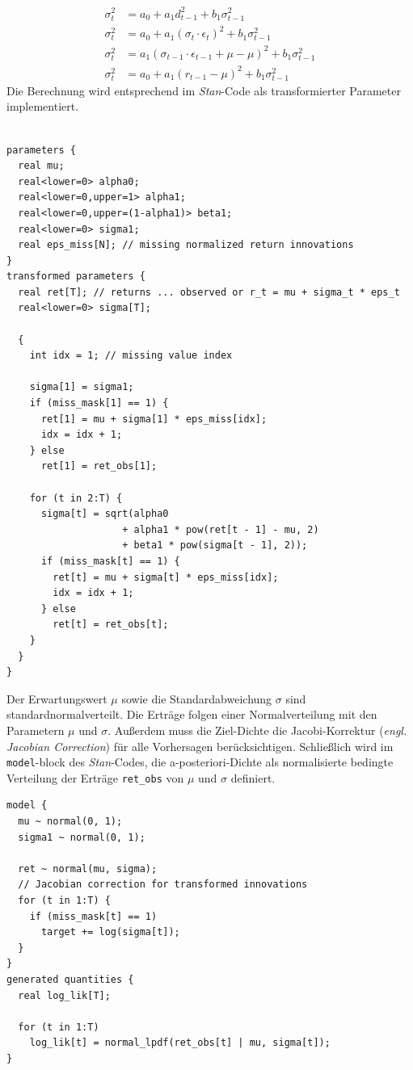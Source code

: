 \documentclass[ngerman]{ttlab-qualify}
\begin{document}
\begin{align}
\sigma_t^2 &= a_0 + a_1d_{t-1}^2 + b_1\sigma_{t-1}^2 \nonumber \\
\sigma_t^2 &=a_0+a_1(\sigma_t\cdot \epsilon_t)^2 + b_1\sigma_{t-1}^2\nonumber \\
\sigma_t^2 &=a_1(\sigma_{t-1}\cdot \epsilon_{t-1} +\mu -\mu)^2 +b_1\sigma_{t-1}^2 \nonumber \\
\sigma_t^2 &= a_0+a_1(r_{t-1}-\mu)^2 +b_1\sigma_{t-1}^2
\end{align} 
Die Berechnung wird entsprechend im \textit{Stan}-Code als  transformierter Parameter implementiert.
\begin{lstlisting}[style=custom]

parameters {
  real mu;
  real<lower=0> alpha0;
  real<lower=0,upper=1> alpha1;
  real<lower=0,upper=(1-alpha1)> beta1;
  real<lower=0> sigma1;
  real eps_miss[N]; // missing normalized return innovations
}
transformed parameters {
  real ret[T]; // returns ... observed or r_t = mu + sigma_t * eps_t
  real<lower=0> sigma[T];

  {
    int idx = 1; // missing value index

    sigma[1] = sigma1;
    if (miss_mask[1] == 1) {
      ret[1] = mu + sigma[1] * eps_miss[idx];
      idx = idx + 1;
    } else
      ret[1] = ret_obs[1];

    for (t in 2:T) {
      sigma[t] = sqrt(alpha0
                    + alpha1 * pow(ret[t - 1] - mu, 2)
                    + beta1 * pow(sigma[t - 1], 2));
      if (miss_mask[t] == 1) {
        ret[t] = mu + sigma[t] * eps_miss[idx];
        idx = idx + 1;
      } else
        ret[t] = ret_obs[t];
    }
  }
}

\end{lstlisting}
Der Erwartungswert $\mu$ sowie die Standardabweichung $\sigma$ sind standardnormalverteilt. Die Erträge folgen einer Normalverteilung mit den Parametern $\mu$ und $\sigma$. Außerdem muss die Ziel-Dichte die Jacobi-Korrektur (\textit{engl. Jacobian Correction}) für alle Vorhersagen berücksichtigen.
Schließlich wird im \verb|model|-block des \textit{Stan}-Codes, die a-posteriori-Dichte als normalisierte bedingte Verteilung der Erträge \verb|ret_obs| von $\mu$ und $\sigma$ definiert.

\begin{lstlisting}[style=custom]
model {
  mu ~ normal(0, 1);
  sigma1 ~ normal(0, 1);

  ret ~ normal(mu, sigma);
  // Jacobian correction for transformed innovations
  for (t in 1:T) {
    if (miss_mask[t] == 1)
      target += log(sigma[t]);
  }
}
generated quantities {
  real log_lik[T];

  for (t in 1:T)
    log_lik[t] = normal_lpdf(ret_obs[t] | mu, sigma[t]);
}
\end{lstlisting}
 
\end{document}
